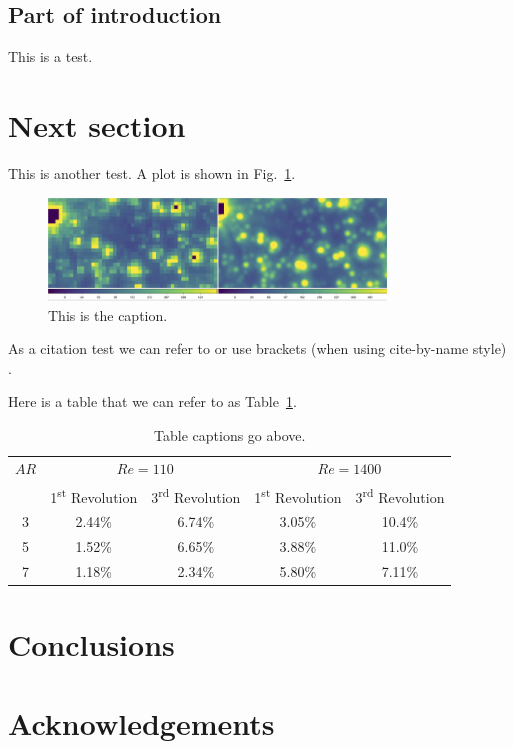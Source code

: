 \documentclass{UCreport}
\begin{document}
\subsection{Part of introduction}
This is a test.

\newpage

\section{Next section}

This is another test. A plot is shown in Fig.~\ref{fig:plot}.

\begin{figure}[ht]
\centering
\includegraphics[width=0.8\textwidth]{figures/test_figure.png}
\caption{This is the caption.}
\label{fig:plot}
\end{figure}



As a citation test we can refer to \citet{Albrow2022} or use brackets (when using cite-by-name style) \citep{Hurley2005}.


Here is a table that we can refer to as Table~\ref{table:table1}.

\vspace{1cm}

\begin{table}[ht]
    \caption{Table captions go above.}
    \label{table:table1}
    \begin{tabular}{|c|cc|cc|}
    \toprule
    $AR$ & \multicolumn{2}{c}{$Re=110$} & \multicolumn{2}{c}{$Re=1400$} \\
    & 1\textsuperscript{st} Revolution & 3\textsuperscript{rd} Revolution & 1\textsuperscript{st} Revolution & 3\textsuperscript{rd} Revolution \\
    \hline
    3 & 2.44\% & 6.74\% & 3.05\% & 10.4\% \\
    5 & 1.52\% & 6.65\% & 3.88\% & 11.0\% \\
    7 & 1.18\% & 2.34\% & 5.80\% & 7.11\% \\
    \bottomrule
    \end{tabular}
\end{table}


\section{Conclusions}


\section*{Acknowledgements}




\newpage

%
%

 
\end{document}
